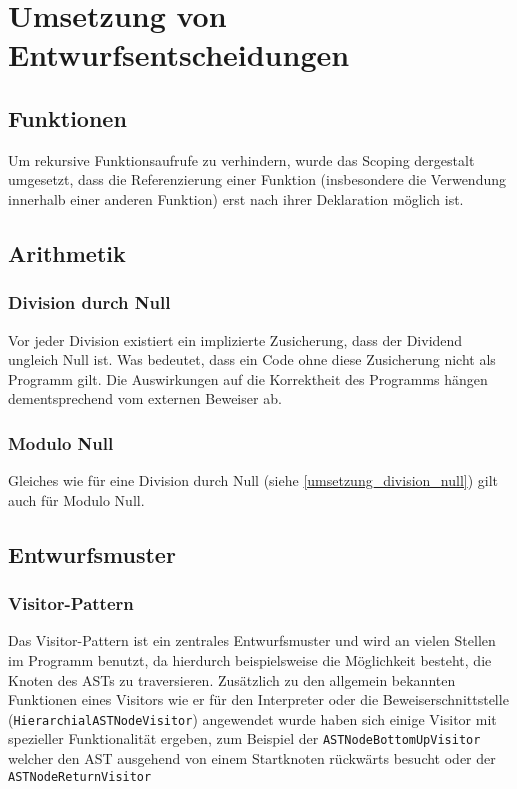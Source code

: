 \section{Umsetzung von Entwurfsentscheidungen}
\subsection{Funktionen}
Um rekursive Funktionsaufrufe zu verhindern, wurde das Scoping dergestalt umgesetzt, dass die Referenzierung einer Funktion (insbesondere die Verwendung innerhalb einer anderen Funktion) erst nach ihrer Deklaration möglich ist.

\subsection{Arithmetik}
\subsubsection{Division durch Null \label{umsetzung_division_null}}
Vor jeder Division existiert ein implizierte Zusicherung, dass der Dividend ungleich Null ist. Was bedeutet, dass ein Code ohne diese Zusicherung nicht als Programm gilt. Die Auswirkungen auf die Korrektheit des Programms hängen dementsprechend vom externen Beweiser ab.

\subsubsection{Modulo Null}
Gleiches wie für eine Division durch Null (siehe \ref{umsetzung_division_null}) gilt auch für Modulo Null.

\subsection{Entwurfsmuster}
\subsubsection{Visitor-Pattern}
Das Visitor-Pattern ist ein zentrales Entwurfsmuster und wird an vielen Stellen im Programm benutzt, da hierdurch beispielsweise die Möglichkeit besteht, die Knoten des ASTs zu traversieren. Zusätzlich zu den allgemein bekannten Funktionen eines Visitors wie er für den Interpreter oder die Beweiserschnittstelle (\texttt{HierarchialASTNodeVisitor}) angewendet wurde haben sich einige Visitor mit spezieller Funktionalität ergeben, zum Beispiel der \texttt{ASTNodeBottomUpVisitor} welcher den AST ausgehend von einem Startknoten rückwärts besucht oder der \texttt{ASTNodeReturnVisitor} %

